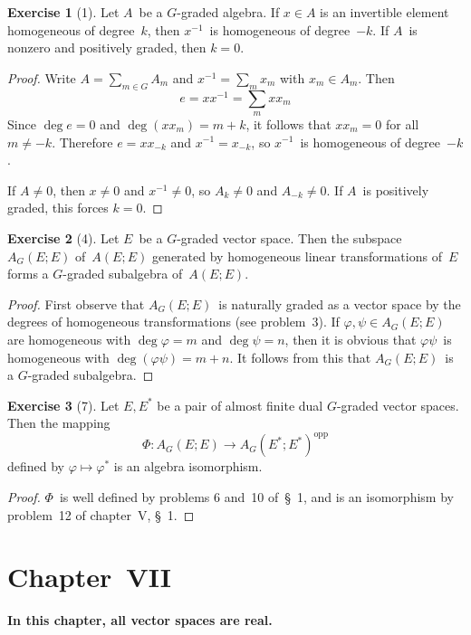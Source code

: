 \documentclass[letterpaper,12pt]{article}
\newcommand{\opp}[1]{#1^{\mathrm{opp}}}
\theoremstyle{definition}
\newtheorem*{exer}{Exercise}
\theoremstyle{remark}
\begin{document}
\begin{exer}[1]
Let \(A\)~be a \(G\)-graded algebra. If \(x\in A\) is an invertible element homogeneous of degree~\(k\), then \(x^{-1}\)~is homogeneous of degree~\(-k\). If \(A\)~is nonzero and positively graded, then \(k=0\).
\end{exer}
\begin{proof}
Write \(A=\sum_{m\in G}A_m\) and \(x^{-1}=\sum_m x_m\) with \(x_m\in A_m\). Then
\[e=xx^{-1}=\sum_m xx_m\]
Since \(\deg e=0\) and \(\deg(xx_m)=m+k\), it follows that \(xx_m=0\) for all \(m\ne-k\). Therefore \(e=xx_{-k}\) and \(x^{-1}=x_{-k}\), so \(x^{-1}\)~is homogeneous of degree~\(-k\).

If \(A\ne 0\), then \(x\ne 0\) and \(x^{-1}\ne 0\), so \(A_k\ne 0\) and \(A_{-k}\ne 0\). If \(A\)~is positively graded, this forces \(k=0\).
\end{proof}

\begin{exer}[4]
Let \(E\)~be a \(G\)-graded vector space. Then the subspace \(A_G(E;E)\) of~\(A(E;E)\) generated by homogeneous linear transformations of~\(E\) forms a \(G\)-graded subalgebra of~\(A(E;E)\).
\end{exer}
\begin{proof}
First observe that \(A_G(E;E)\)~is naturally graded as a vector space by the degrees of homogeneous transformations (see problem~3). If \(\varphi,\psi\in A_G(E;E)\) are homogeneous with \(\deg\varphi=m\) and \(\deg\psi=n\), then it is obvious that \(\varphi\psi\)~is homogeneous with \(\deg(\varphi\psi)=m+n\). It follows from this that \(A_G(E;E)\)~is a \(G\)-graded subalgebra.
\end{proof}

\begin{exer}[7]
Let \(E,E^*\) be a pair of almost finite dual \(G\)-graded vector spaces. Then the mapping
\[\Phi:A_G(E;E)\to\opp{A_G(E^*;E^*)}\]
defined by \(\varphi\mapsto\varphi^*\) is an algebra isomorphism.
\end{exer}
\begin{proof}
\(\Phi\)~is well defined by problems 6 and~10 of~\S~1, and is an isomorphism by problem~12 of chapter~V, \S~1.
\end{proof}

\newpage
\section*{Chapter~VII}
\textbf{In this chapter, all vector spaces are real.}
\end{document}
